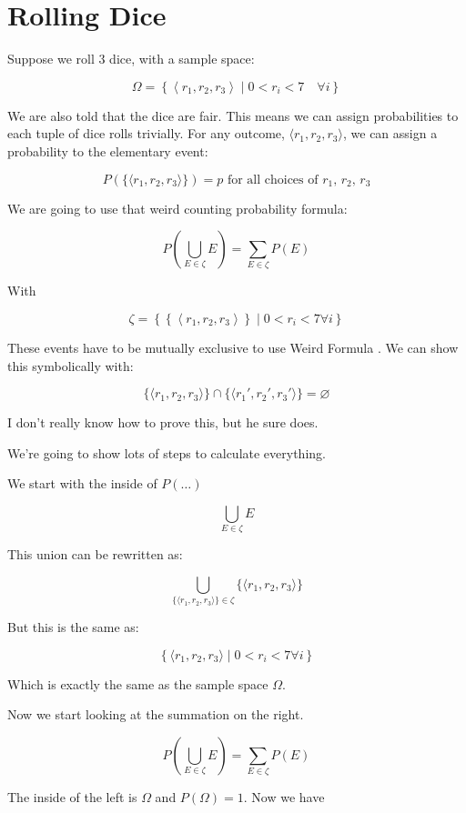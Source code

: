 \documentclass{article}
\begin{document}
\section*{Rolling Dice}

Suppose we roll 3 dice, with a sample space:

\[
\Omega=\left\{\left\langle r_1, r_2, r_3\right\rangle\mid 0<r_i<7\quad\forall i\right\}
\]

We are also told that the dice are fair. This means we can assign
probabilities to each tuple of dice rolls trivially. For any outcome,
$\langle{}r_1,r_2,r_3\rangle$, we can assign a probability to the
elementary event:

\[
P(\{\langle r_1,r_2,r_3\rangle\})=p\text{ for all choices of $r_1$, $r_2$, $r_3$}
\]

We are going to use that weird counting probability formula:

\[
P\left(\bigcup\limits_{E\in\zeta}E\right)=\sum\limits_{E\in\zeta}P(E)
\]

With

\[
\zeta=\left\{\left\{\left\langle r_1,r_2,r_3\right\rangle\right\}\mid 0<r_i<7\forall i\right\}
\]

These events have to be mutually exclusive to use Weird Formula
\texttrademark. We can show this symbolically with:

\[
\{\langle r_1,r_2,r_3\rangle\}\cap\{\langle r_1', r_2', r_3'\rangle\} = \varnothing
\]

I don't really know how to prove this, but he sure does.

We're going to show lots of steps to calculate everything.

We start with the inside of $P(\dots)$

\[
\bigcup\limits_{E\in\zeta}E
\]

This union can be rewritten as:

\[
\bigcup\limits_{\{\langle r_1,r_2,r_3\rangle\}\in\zeta} \{\langle r_1,r_2,r_3\rangle\}
\]

But this is the same as:

\[
\left\{\langle r_1,r_2,r_3\rangle\mid 0<r_i<7\forall i\right\}
\]

Which is exactly the same as the sample space $\Omega$.

Now we start looking at the summation on the right.

\[
P\left(\bigcup\limits_{E\in\zeta}E\right) = \sum\limits_{E\in\zeta} P(E)
\]

The inside of the left is $\Omega$ and $P(\Omega)=1$. Now we have
\end{document}
